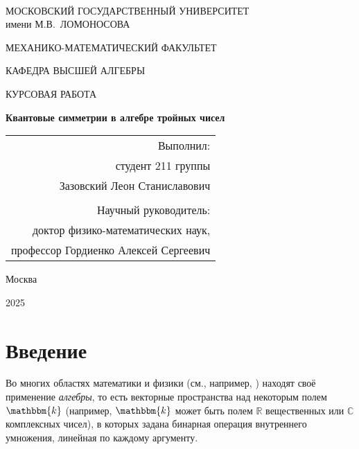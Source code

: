 \documentclass[12pt, reqno, a4paper, oneside, notitlepage]{amsart}
\theoremstyle{mytheoremstyle}
\theoremstyle{myremarkstyle}
\numberwithin{equation}{section}
\begin{document}
{\fontsize{14pt}{18}\selectfont
  
  \thispagestyle{empty}
  \begin{center}
		
		\vfill\vfill \ \\ {%
			МОСКОВСКИЙ ГОСУДАРСТВЕННЫЙ УНИВЕРСИТЕТ \\
			имени М.В.~ЛОМОНОСОВА
			
			\medskip
			
			МЕХАНИКО-МАТЕМАТИЧЕСКИЙ ФАКУЛЬТЕТ

			\medskip
			
			
			КАФЕДРА ВЫСШЕЙ АЛГЕБРЫ

		}



{%
	\vfill {%
		
		КУРСОВАЯ РАБОТА
		
	}
		
		
		\vfill{\Large
			\textbf{Квантовые симметрии \linebreak в алгебре тройных чисел} 
		}
		
			

			\vfill
			\begin{flushright}
				\begin{tabular}{r}
					Выполнил:\\
студент 211 группы \\
Зазовский Леон Станиславович
					\\
					\\
					Научный руководитель: \\
					доктор физико-математических наук, \\
					профессор Гордиенко Алексей Сергеевич
				\end{tabular}
			\end{flushright}
			
		}
		
		\vfill\vfill\vfill\vfill 
		
		Москва
		
		 2025
	\end{center}
}

\newpage

\thispagestyle{empty}
\tableofcontents

\newpage

\pagestyle{plain}
\section{Введение}

Во многих областях математики и физики (см., например, \cite{ArnoldBook, ModernGeometry, MurphyBook, HaagKastler}) находят своё применение \textit{алгебры}, то есть векторные пространства над некоторым полем $\mathbbm{k}$ (например, $\mathbbm{k}$ может быть полем $\mathbb{R}$ вещественных или $\mathbb{C}$ комплексных чисел), в которых задана бинарная операция внутреннего умножения, линейная по каждому аргументу. 
\end{document}
